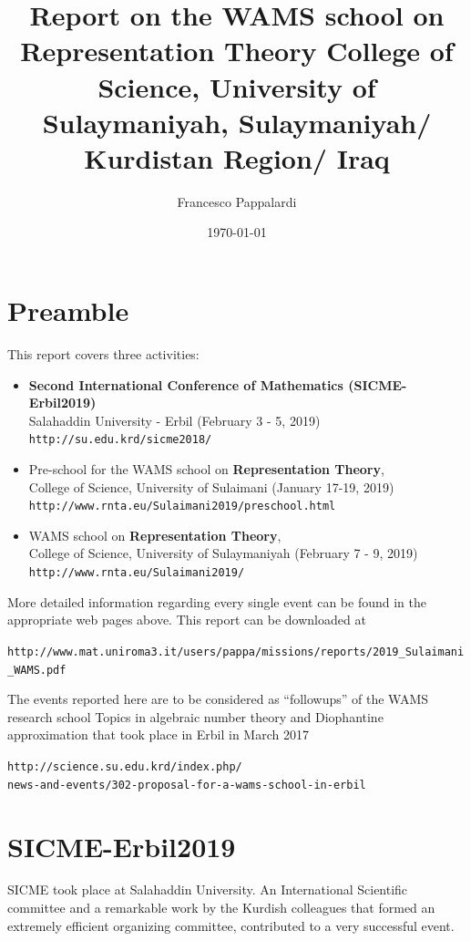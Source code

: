 \documentclass[12pt,a4paper]{scrartcl}
\title{%
Report on the WAMS school on
Representation Theory
College of Science, University of Sulaymaniyah, Sulaymaniyah/ Kurdistan Region/ Iraq}
\author{Francesco Pappalardi}
\date{\today}
\begin{document}
\maketitle

\section{Preamble}

This report covers three activities:
\begin{itemize}
 \item \textbf{Second International Conference of Mathematics (SICME-Erbil2019)}\\
Salahaddin University - Erbil (February 3 - 5, 2019)\\
\texttt{http://su.edu.krd/sicme2018/}
\item  Pre-school for the WAMS school on \textbf{Representation Theory},\\
 College of Science, University of Sulaimani (January 17-19, 2019) \\
\texttt{http://www.rnta.eu/Sulaimani2019/preschool.html} 
 \item WAMS school on
\textbf{Representation Theory},\\
College of Science, University of Sulaymaniyah (February 7 - 9, 2019)\\
\texttt{http://www.rnta.eu/Sulaimani2019/}
\end{itemize}

More detailed information regarding every single event can be found in the appropriate web pages above. This report can be downloaded at

\texttt{http://www.mat.uniroma3.it/users/pappa/missions/reports/2019\_Sulaimani\_WAMS.pdf}

The events reported here are to be considered as  ``followups'' of the WAMS research school Topics in algebraic number theory and Diophantine approximation that took place in Erbil in March 2017

\texttt{http://science.su.edu.krd/index.php/\\ \hspace*{4cm}\hfil news-and-events/302-proposal-for-a-wams-school-in-erbil}

\section{SICME-Erbil2019}

SICME took place at Salahaddin University. 
An International Scientific committee and a remarkable work by the Kurdish colleagues that formed an extremely efficient organizing committee, contributed to a very successful event.
\end{document}
